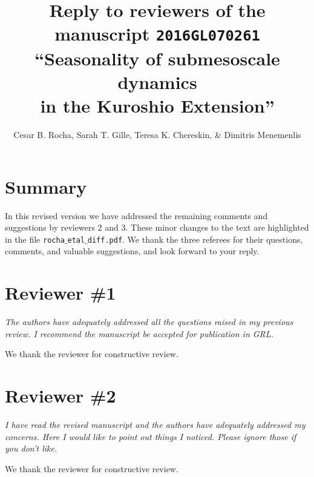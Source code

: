 \documentclass[11pt]{article}
\title{{\normalfont Reply to reviewers of the manuscript \texttt{2016GL070261} }
       ``Seasonality of submesoscale
       dynamics \\in the Kuroshio Extension''}
\author{Cesar B. Rocha,
        Sarah T. Gille, Teresa K. Chereskin, \& Dimitris Menemenlis}
\date{}
\newcommand{\bdp}{\begin{description}}
\newcommand{\edp}{\end{description}}
\begin{document}
%

\maketitle

\section*{Summary}

In this revised version we have addressed the remaining comments and suggestions
by reviewers 2 and 3.
These minor changes to the text are highlighted in the file \texttt{rocha$\_$etal$\_$diff.pdf}.
We thank the three referees for their questions, comments, and valuable suggestions,
and look forward to your reply.

\section{Reviewer \#1}

{\it The authors have adequately addressed all the questions raised in my
previous review. I recommend the manuscript be accepted for publication in GRL.}

\bdp
  \item We thank the reviewer for constructive review.
\edp

\section{Reviewer \#2}

{\it I have read the revised manuscript and the authors have adequately addressed
     my concerns. Here I would like to point out things I noticed.
     Please ignore those if you don't like.}

\bdp
   \item We thank the reviewer for constructive review.
\edp
\end{document}
